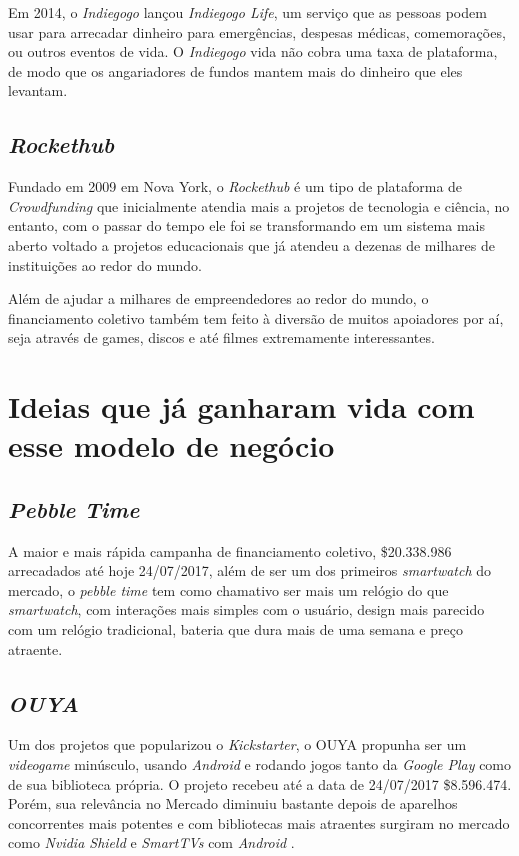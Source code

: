 \documentclass{classe_cn}                 %
\begin{document}
Em 2014, o \textit{Indiegogo} lançou \textit{Indiegogo Life}, um serviço que as pessoas podem usar para arrecadar dinheiro para emergências, despesas médicas, comemorações, ou outros eventos de vida. O \textit{Indiegogo} vida não cobra uma taxa de plataforma, de modo que os angariadores de fundos mantem mais do dinheiro que eles levantam.

\subsection{\textit{Rockethub}}

Fundado em 2009 em Nova York, o \textit{Rockethub} é um tipo de plataforma de \textit{Crowdfunding}  que inicialmente atendia mais a projetos de tecnologia e ciência, no entanto, com o passar do tempo ele foi se transformando em um sistema mais aberto voltado a projetos educacionais que já atendeu a dezenas de milhares de instituições ao redor do mundo.

Além de ajudar a milhares de empreendedores ao redor do mundo, o financiamento coletivo também tem feito à diversão de muitos apoiadores por aí, seja através de games, discos e até filmes extremamente interessantes.

\section{Ideias que já ganharam vida com esse modelo de negócio}

\subsection{\textit{Pebble Time}}

A maior e mais rápida campanha de financiamento coletivo, \$20.338.986 arrecadados até hoje 24/07/2017, além de ser um dos primeiros \textit{smartwatch} do mercado, o \textit{pebble time} tem como chamativo ser mais um relógio do que \textit{smartwatch}, com interações mais simples com o usuário, design mais parecido com um relógio tradicional, bateria que dura mais de uma semana e preço atraente. \cite{ONOFFRE:2017}

\subsection{\textit{OUYA}}

Um dos projetos que popularizou o \textit{Kickstarter}, o OUYA propunha ser um \textit{videogame} minúsculo, usando \textit{Android} e rodando jogos tanto da \textit{Google Play} como de sua biblioteca própria. O projeto recebeu até a data de 24/07/2017 \$8.596.474. Porém, sua relevância no Mercado diminuiu bastante depois de aparelhos concorrentes mais potentes e com bibliotecas mais atraentes surgiram no mercado como \textit{Nvidia Shield} e \textit{SmartTVs} com \textit{Android} \cite{ONOFFRE:2017}.
\end{document}
